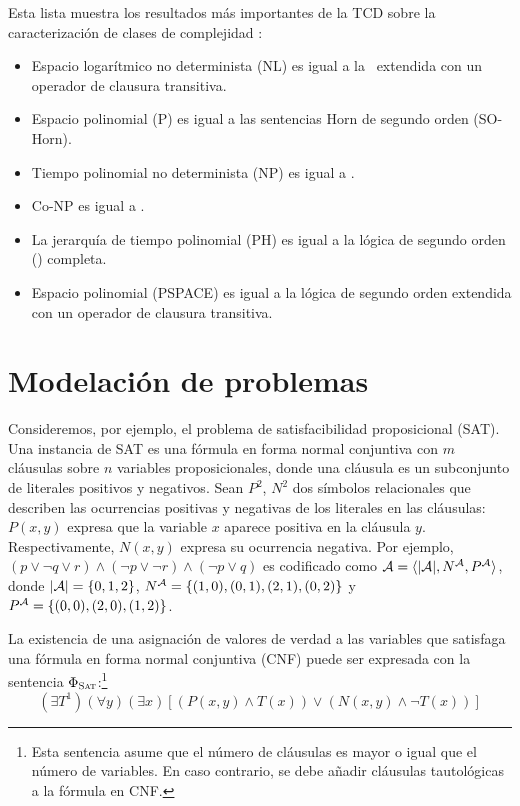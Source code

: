 Esta lista muestra los resultados más importantes de la TCD sobre la
caracterización de clases de complejidad \citep{immerman:book}:
\begin{itemize}
\item Espacio logarítmico no determinista (NL) es igual a la \LPO\ extendida con
un operador de clausura transitiva.
\item Espacio polinomial (P) es igual a las sentencias Horn de segundo orden
(SO-Horn).
\item Tiempo polinomial no determinista (NP) es igual a \SOE.
\item Co-NP es igual a \SOA.
\item La jerarquía de tiempo polinomial (PH) es igual a la lógica 
de segundo orden (\LSO) completa.
\item Espacio polinomial (PSPACE) es igual a la lógica de segundo orden
extendida con un operador de clausura transitiva.
\end{itemize}


\section{Modelación de problemas}
\label{modelacionproblemas}
Consideremos, por ejemplo, el problema de satisfacibilidad
proposicional (SAT). Una instancia de SAT es una fórmula en forma normal
conjuntiva con $m$ cláusulas sobre $n$ variables proposicionales, donde una
cláusula es un subconjunto de literales positivos y negativos. 
Sean $P^2$, $N^2$ dos símbolos relacionales que describen las ocurrencias
positivas y negativas de los literales en las cláusulas: $P(x, y)$ expresa que
la variable $x$ aparece positiva en la cláusula $y$. Respectivamente, $N(x, y)$ expresa
su ocurrencia negativa.
Por ejemplo, $(p\lor \neg q\lor r)\land(\neg p\lor \neg r)\land(\neg p\lor q)$
es codificado como $\mathcal{A}=\langle |\mathcal{A}|,N^{\mathcal{A}},P^{\mathcal{A}} \rangle$, donde $|\mathcal{A}|=\{0,1,2\}$,
$N^{\mathcal{A}}=\{(1,0),(0,1),(2,1),(0,2)\}$ y $P^{\mathcal{A}}=\{(0,0),(2,0),(1,2)\}$.

La existencia de una asignación de valores de verdad a las variables que
satisfaga una fórmula en forma normal conjuntiva (CNF) puede ser expresada con la
sentencia \SOE $\Phi_{\textsc{Sat}}$:\footnote{Esta sentencia
asume que el número de cláusulas es mayor o igual que el número de variables. 
En caso contrario, se debe añadir cláusulas tautológicas a la fórmula en CNF.}
\[ (\exists T^1)(\forall y)(\exists x)[(P(x,y)\land T(x))\lor(N(x,y)\land\neg T(x))] \]

